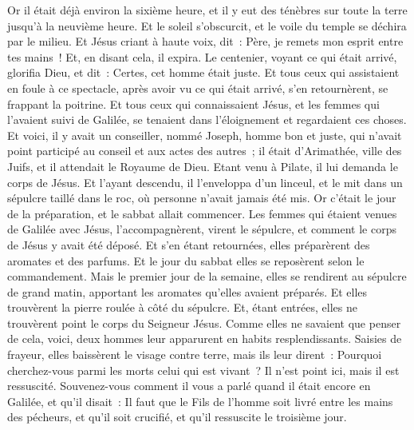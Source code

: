 \begin{multicols}{2}
Or il était déjà environ la sixième heure, et il y eut des ténèbres sur toute la terre jusqu'à la neuvième heure.
Et le soleil s'obscurcit, et le voile du temple se déchira par le milieu.
Et Jésus criant à haute voix, dit~: Père, je remets mon esprit entre tes mains~! Et, en disant cela, il expira.
Le centenier, voyant ce qui était arrivé, glorifia Dieu, et dit~: Certes, cet homme était juste.
Et tous ceux qui assistaient en foule à ce spectacle, après avoir vu ce qui était arrivé, s'en retournèrent, se frappant la poitrine.
Et tous ceux qui connaissaient Jésus, et les femmes qui l'avaient suivi de Galilée, se tenaient dans l'éloignement et regardaient ces choses.
Et voici, il y avait un conseiller, nommé Joseph, homme bon et juste,
qui n'avait point participé au conseil et aux actes des autres~; il était d'Arimathée, ville des Juifs, et il attendait le Royaume de Dieu.
Etant venu à Pilate, il lui demanda le corps de Jésus.
Et l'ayant descendu, il l'enveloppa d'un linceul, et le mit dans un sépulcre taillé dans le roc, où personne n'avait jamais été mis.
Or c'était le jour de la préparation, et le sabbat allait commencer.
Les femmes qui étaient venues de Galilée avec Jésus, l'accompagnèrent, virent le sépulcre, et comment le corps de Jésus y avait été déposé.
Et s'en étant retournées, elles préparèrent des aromates et des parfums. Et le jour du sabbat elles se reposèrent selon le commandement.
\VerseOne{}Mais le premier jour de la semaine, elles se rendirent au sépulcre de grand matin, apportant les aromates qu'elles avaient préparés.
Et elles trouvèrent la pierre roulée à côté du sépulcre.
Et, étant entrées, elles ne trouvèrent point le corps du Seigneur Jésus.
Comme elles ne savaient que penser de cela, voici, deux hommes leur apparurent en habits resplendissants.
Saisies de frayeur, elles baissèrent le visage contre terre, mais ils leur dirent~: Pourquoi cherchez-vous parmi les morts celui qui est vivant~?
Il n'est point ici, mais il est ressuscité. Souvenez-vous comment il vous a parlé quand il était encore en Galilée,
et qu'il disait~: Il faut que le Fils de l'homme soit livré entre les mains des pécheurs, et qu'il soit crucifié, et qu'il ressuscite le troisième jour.

\end{multicols}
